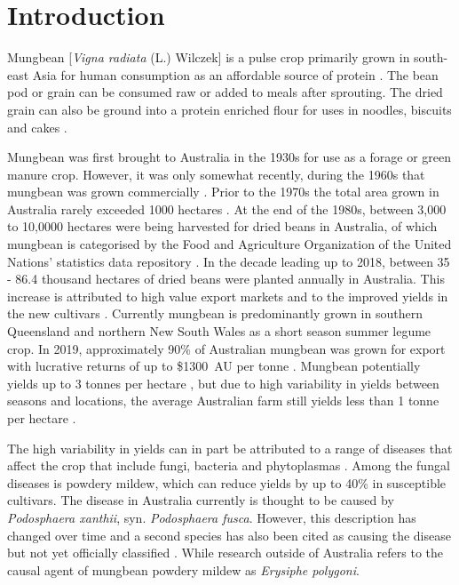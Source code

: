 \documentclass[agronomy,article,submit,moreauthors,pdftex]{mdpi}
\begin{document}

\hypertarget{introduction}{%
\section{Introduction}\label{introduction}}

Mungbean {[}\emph{Vigna radiata} (L.) Wilczek{]} is a pulse crop primarily grown in south-east Asia for human consumption as an affordable source of protein \citep{Lambrides2007}.
The bean pod or grain can be consumed raw or added to meals after sprouting.
The dried grain can also be ground into a protein enriched flour for uses in noodles, biscuits and cakes \citep{Chankaew2013}.

Mungbean was first brought to Australia in the 1930s for use as a forage or green manure crop.
However, it was only somewhat recently, during the 1960s that mungbean was grown commercially \citep{Lawn1978, Chauhan2018}.
Prior to the 1970s the total area grown in Australia rarely exceeded 1000 hectares \citep{Lawn1978}.
At the end of the 1980s, between 3,000 to 10,0000 hectares were being harvested for dried beans in Australia, of which mungbean is categorised by the Food and Agriculture Organization of the United Nations' statistics data repository \citep{FAOSTAT}.
In the decade leading up to 2018, between 35 - 86.4 thousand hectares of dried beans were planted annually in Australia.
This increase is attributed to high value export markets and to the improved yields in the new cultivars \citep{Clarry2016}.
Currently mungbean is predominantly grown in southern Queensland and northern New South Wales as a short season summer legume crop.
In 2019, approximately 90\% of Australian mungbean was grown for export with lucrative returns of up to \$1300~AU per tonne \citep{QueenslandGovernment2019}.
Mungbean potentially yields up to 3 tonnes per hectare \citep{ThomasRobert2004}, but due to high variability in yields between seasons and locations, the average Australian farm still yields less than 1 tonne per hectare \citep{Chauhan2018}.

The high variability in yields can in part be attributed to a range of diseases that affect the crop that include fungi, bacteria and phytoplasmas \citep{Wood1990, Conde1991, Thakur1995, Fuhlbohm1996, Fuhlbohm2013, Wilson2001, Noble2019}.
Among the fungal diseases is powdery mildew, which can reduce yields by up to 40\% \citep{Chankaew2013} in susceptible cultivars.
The disease in Australia currently is thought to be caused by \emph{Podosphaera xanthii}, syn. \emph{Podosphaera fusca}.
However, this description has changed over time and a second species has also been cited as causing the disease but not yet officially classified \citep{Kelly2019}.
While research outside of Australia refers to the causal agent of mungbean powdery mildew as \emph{Erysiphe polygoni}.
\end{document}
